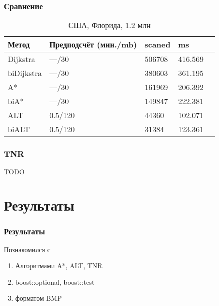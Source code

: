 \documentclass{beamer}
\begin{document}

\begin{frame}
\frametitle{Сравнение}
\begin{table}
\begin{tabular}{l l l l l}
\toprule
\textbf{Метод} & \textbf{Предподсчёт (мин./mb)} & \textbf{scaned} 
& \textbf{ms}\\
\midrule
Dijkstra    & ---/30  & 506708 & 416.569\\
biDijkstra  & ---/30  & 380603 & 361.195\\
A*          & ---/30  & 161969 & 206.392\\
biA*        & ---/30  & 149847 & 222.381\\
ALT         & 0.5/120  &  44360 & 102.071\\
biALT       & 0.5/120  &  31384 & 123.361\\
\bottomrule
\end{tabular}
\caption{США, Флорида, 1.2 млн}
\end{table}
\end{frame}


\begin{frame}
\frametitle{TNR}
TODO
\end{frame}



\section{Результаты}

\begin{frame}
\frametitle{Результаты}
Познакомился с 
\begin{enumerate}
\item Алгоритмами A*, ALT, TNR
\item boost::optional, boost::test
\item форматом BMP 
\end{enumerate}
\end{frame}


\end{document}
